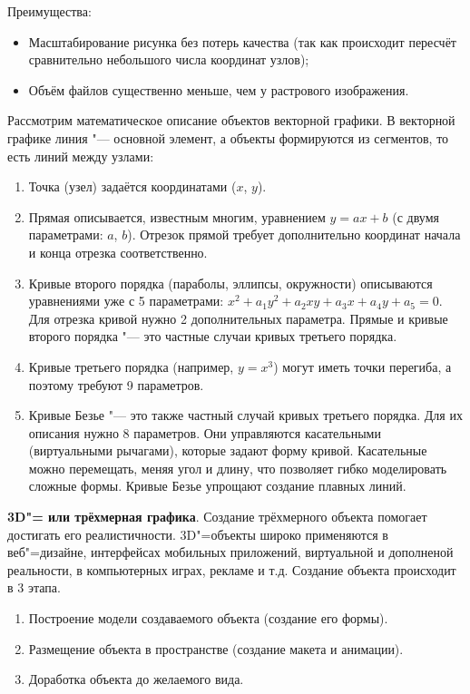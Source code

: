 Преимущества:
\begin{itemize}
    \item Масштабирование рисунка без потерь качества (так как происходит пересчёт сравнительно небольшого числа координат узлов);
    \item Объём файлов существенно меньше, чем у растрового изображения.
\end{itemize}

Рассмотрим математическое описание объектов векторной графики. В векторной графике линия "--- основной элемент, а объекты формируются из сегментов, то есть линий между узлами: \cite{vec_graphics}
\begin{enumerate}
    \item Точка (узел) задаётся координатами ($x$, $y$).
    \item Прямая описывается, известным многим, уравнением $y = ax + b$ (с двумя параметрами: $a$, $b$). Отрезок прямой требует дополнительно координат начала и конца отрезка соответственно.
    \item Кривые второго порядка (параболы, эллипсы, окружности) описываются уравнениями уже с 5 параметрами: $x^{2} + a_{1}y^{2} + a_{2}xy + a_{3}x + a_{4}y + a_{5} = 0$. Для отрезка кривой нужно 2 дополнительных параметра.
    Прямые и кривые второго порядка "--- это частные случаи кривых третьего порядка.
    \item Кривые третьего порядка (например, $y = x^{3}$) могут иметь точки перегиба, а поэтому требуют 9 параметров.
    \item Кривые Безье "--- это также частный случай кривых третьего порядка. Для их описания нужно 8 параметров. Они управляются касательными (виртуальными рычагами), которые задают форму кривой. Касательные можно перемещать, меняя угол и длину, что позволяет гибко моделировать сложные формы. Кривые Безье упрощают создание плавных линий.
\end{enumerate}

\textbf{3D"= или трёхмерная графика}. Создание трёхмерного объекта помогает достигать его реалистичности. 3D"=объекты широко применяются в веб"=дизайне, интерфейсах мобильных приложений, виртуальной и дополненой реальности, в компьютерных играх, рекламе и т.д. Создание объекта происходит в 3 этапа.
\begin{enumerate}
    \item Построение модели создаваемого объекта (создание его формы).
    \item Размещение объекта в пространстве (создание макета и анимации).
    \item Доработка объекта до желаемого вида.
\end{enumerate}

